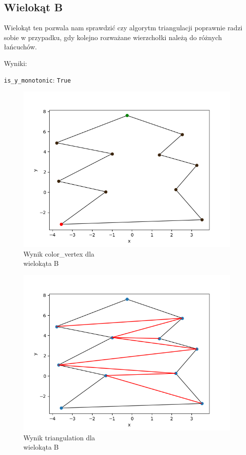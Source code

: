 \documentclass[11pt,a4paper]{article}
\begin{document}
\subsection{Wielokąt B}
Wielokąt ten pozwala nam sprawdzić czy algorytm triangulacji
poprawnie radzi sobie w przypadku, gdy kolejno rozważane wierzchołki 
należą do różnych łańcuchów.

Wyniki:

\verb|is_y_monotonic|: \verb|True|

\begin{minipage}{0.46\textwidth}
    \begin{figure}[H]
        \centering
        \includegraphics[scale=0.5]{res/pol_b_colors.png}
        \caption{Wynik \ttfamily color\_vertex \normalfont dla \\wielokąta B}
    \end{figure}
\end{minipage}
\begin{minipage}{0.46\textwidth}
    \begin{figure}[H]
        \centering
        \includegraphics[scale=0.5]{res/pol_b_tri.png}
        \caption{Wynik \ttfamily triangulation \normalfont dla \\wielokąta B}
    \end{figure}
\end{minipage}
\end{document}
